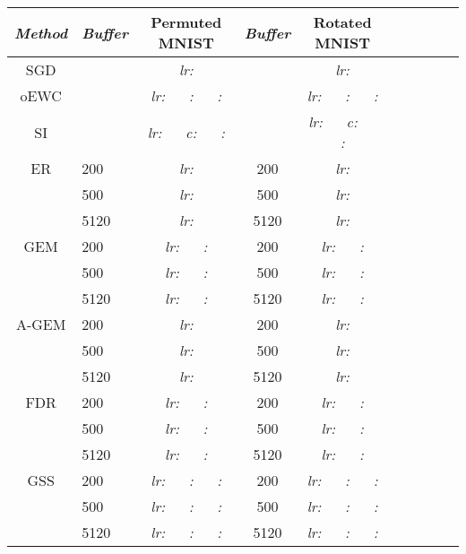 \documentclass{article}
\newcommand{\xmark}{\textbf{\textendash}}
\begin{document}
\begin{table}[H]
\centering\begin{tabular}{| Sl | Sc | Sl | Sc | Sl |}
\hline
\textit{Method} & \textit{Buffer} & \textbf{Permuted MNIST} & \textit{Buffer} & \textbf{Rotated MNIST}\\ 
\hline
SGD     & \xmark & \textit{lr:}  & \xmark & \textit{lr:}  \\
oEWC    & \xmark & \textit{lr:}  ~~ \textit{:}  ~~ \textit{:}  & \xmark & \textit{lr:}  ~~ \textit{:}  ~~ \textit{:}  \\
SI      & \xmark & \textit{lr:}  ~~ \textit{c:}  ~~ \textit{:}  & \xmark & \textit{lr:}  ~~ \textit{c:}  ~~ \textit{:}  \\
ER      & 200    & \textit{lr:}        & 200  &\textit{lr:}    \\
        & 500    & \textit{lr:}        & 500  &\textit{lr:}     \\
        & 5120   & \textit{lr:}        & 5120 &\textit{lr:}    \\
GEM     & 200    & \textit{lr:}  ~~ \textit{:}  & 200  &\textit{lr:}  ~~  \textit{:}  \\
        & 500    & \textit{lr:}  ~~ \textit{:}  & 500  &\textit{lr:}  ~~ \textit{:}  \\
        & 5120   & \textit{lr:}  ~~ \textit{:}  & 5120 &\textit{lr:}  ~~ \textit{:}  \\
A-GEM   & 200    & \textit{lr:}        & 200  &\textit{lr:}    \\
        & 500    & \textit{lr:}        & 500  &\textit{lr:}    \\
        & 5120   & \textit{lr:}        & 5120 &\textit{lr:}    \\
FDR     & 200    & \textit{lr:}   ~~ \textit{:}  & 200  & \textit{lr:}   ~~ \textit{:}  \\
        & 500    & \textit{lr:}   ~~ \textit{:}  & 500  & \textit{lr:}   ~~ \textit{:}  \\
        & 5120   & \textit{lr:}   ~~ \textit{:}  & 5120 & \textit{lr:}   ~~ \textit{:}  \\
GSS     & 200 & \textit{lr:}   ~~ \textit{:}  ~~ \textit{:}  & 200 & \textit{lr:}   ~~ \textit{:}  ~~ \textit{:}  \\
        & 500    & \textit{lr:}   ~~ \textit{:}  ~~ \textit{:}  & 500 & \textit{lr:}   ~~ \textit{:}  ~~ \textit{:}  \\
        & 5120   & \textit{lr:}   ~~ \textit{:}  ~~ \textit{:}  & 5120 & \textit{lr:}   ~~ \textit{:}  ~~ \textit{:}  \\

\end{tabular}
\end{table}
\end{document}
